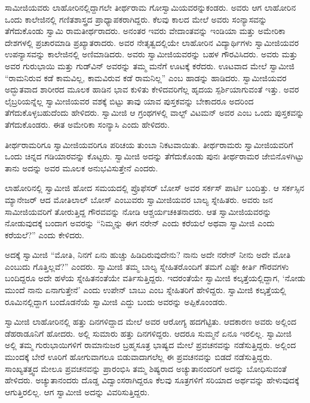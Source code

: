  ಸಾಮೀಜಿಯವರು ಲಾಹೋರಿನಲ್ಲಿದ್ದಾಗಲೇ ತೀರ್ಥರಾಮ ಗೋಸ್ವಾಮಿಯವರನ್ನು\break ಕಂಡರು. ಅವರು ಆಗ ಲಾಹೋರಿನ ಒಂದು ಕಾಲೇಜಿನಲ್ಲಿ ಗಣಿತಶಾಸ್ತ್ರದ ಪ್ರಾಧ್ಯಾಪಕರಾಗಿದ್ದರು. ಕೆಲವು ಕಾಲದ ಮೇಲೆ ಅವರು ಸಂನ್ಯಾಸವನ್ನು ತೆಗೆದುಕೊಂಡು ಸ್ವಾಮಿ ರಾಮತೀರ್ಥರಾದರು. ಅನಂತರ ಇವರು ವೇದಾಂತವನ್ನು ಇಂಡಿಯಾ ಮತ್ತು ಅಮೇರಿಕಾ ದೇಶಗಳಲ್ಲಿ ಪ್ರಚಾರಮಾಡಿ ಪ್ರಖ್ಯಾತರಾದರು. ಅವರ ನೇತೃತ್ವದಲ್ಲಿಯೇ ಲಾಹೋರಿನ ವಿದ್ಯಾರ್ಥಿಗಳು ಸ್ವಾಮೀಜಿಯವರ ಉಪನ್ಯಾಸವನ್ನು ಕಾಲೇಜಿನಲ್ಲಿ ಅಣಿಮಾಡಿದರು. ಅವರು ಸ್ವಾಮೀಜಿಯವರನ್ನು ಬಹಳ ಗೌರವಿಸಿದರು. ಅವರು ಮತ್ತು ಅವರ ಗುರುಭಾಯಿ ಮತ್ತು ಗುಡ್‍ವಿನ್ ಅವರನ್ನು ತಮ್ಮ ಮನೆಗೆ ಊಟಕ್ಕೆ ಕರೆದರು. ಊಟವಾದ ಮೇಲೆ ಸ್ವಾಮೀಜಿ “ರಾಮನಿರುವ ಕಡೆ ಕಾಮವಿಲ್ಲ, ಕಾಮವಿರುವ ಕಡೆ ರಾಮನಿಲ್ಲ” ಎಂಬ ಹಾಡನ್ನು ಹಾಡಿದರು. ಸ್ವಾಮೀಜಿಯವರ ಅದ್ಭುತವಾದ ಶಾರೀರದ ಮೂಲಕ ಹಾಡಿನ ಭಾವ ಕುಳಿತು ಕೇಳಿದವರಿಗೆಲ್ಲ ಹೃದಯ ಸ್ಪರ್ಶಿಯಾಗುವಂತೆ ಇತ್ತು. ಅವರ ಲೈಬ್ರರಿಯನ್ನೆಲ್ಲ ಸ್ವಾಮೀಜಿಯವರ ವಶಕ್ಕೆ ಬಿಟ್ಟು ತಾವು ಯಾವ ಪುಸ್ತಕವನ್ನು ಬೇಕಾದರೂ ಅದರಿಂದ ತೆಗೆದುಕೊಳ್ಳಬಹುದೆಂದು ಹೇಳಿದರು. ಸ್ವಾಮೀಜಿ ಆ ಗ್ರಂಥಗಳಲ್ಲಿ ವಾಲ್ಟ್ ವಿಟಮನ್ ಅವರ  ಎಂಬ ಒಂದು ಪುಸ್ತಕವನ್ನು ತೆಗೆದುಕೊಂಡರು. ಈತ ಅಮೇರಿಕಾ ಸಂನ್ಯಾಸಿ ಎಂದು ಹೇಳಿದರು. 

 ತೀರ್ಥರಾಮರಿಗೂ ಸ್ವಾಮೀಜಿಯವರಿಗೂ ಪರಿಚಯ ತುಂಬಾ ನಿಕಟವಾಯಿತು. ತೀರ್ಥರಾಮರು ಸ್ವಾಮೀಜಿಯವರಿಗೆ ಒಂದು ಚಿನ್ನದ ಗಡಿಯಾರವನ್ನು ಕೊಟ್ಟರು. ಸ್ವಾಮೀಜಿ ಅದನ್ನು ತೆಗೆದುಕೊಂಡು ಪುನಃ ತೀರ್ಥರಾಮರ ಜೇಬಿನೊಳಗಿಟ್ಟು ತಾನು ಅದನ್ನು ಅವರ ಮೂಲಕ ಅನುಭವಿಸುತ್ತೇನೆ ಎಂದರು. 

 ಲಾಹೋರಿನಲ್ಲಿ ಸ್ವಾಮೀಜಿ ಹೋದ ಸಮಯದಲ್ಲಿ ಪ್ರೊಫೆಸರ್ ಬೋಸ್ ಅವರ ಸರ್ಕಸ್ ಪಾರ್ಟಿ ಬಂದಿತ್ತು. ಆ ಸರ್ಕಸ್ಸಿನ ಮ್ಯಾನೇಜರ್ ಆದ ಮೋತಿಲಾಲ್ ಬೋಸ್ ಎಂಬುವರು ಸ್ವಾಮೀಜಿಯವರ ಬಾಲ್ಯ ಸ್ನೇಹಿತರು. ಅವರು ಜನ ಸಾಮೀಜಿಯವರಿಗೆ ತೋರುತ್ತಿದ್ದ ಗೌರವವನ್ನು ನೋಡಿ ಆಶ್ಚರ್ಯಚಕಿತನಾದರು. ಆತ ಸ್ವಾಮೀಜಿಯವರನ್ನು ನೋಡುವುದಕ್ಕೆ ಬಂದಾಗ ಅವರನ್ನು “ನಿಮ್ಮನ್ನು ಈಗ ನರೇನ್ ಎಂದು ಕರೆಯಲೆ ಅಥವಾ ಸ್ವಾಮೀಜಿ ಎಂದು ಕರೆಯಲೆ?” ಎಂದು ಕೇಳಿದರು. 

 ಅದಕ್ಕೆ ಸ್ವಾಮೀಜಿ “ಮೋತಿ, ನಿನಗೆ ಏನು ಹುಚ್ಚು ಹಿಡಿದಿರುವುದೇನು? ನಾನು ಅದೇ ನರೇನ್ ನೀನು ಅದೇ ಮೋತಿ ಎಂಬುದು ಗೊತ್ತಿಲ್ಲವೆ?” ಎಂದರು. ಸ್ವಾಮೀಜಿ ತಮ್ಮ ಬಾಲ್ಯ ಸ್ನೇಹಿತರೊಂದಿಗೆ ತಮಗೆ ಎಷ್ಟೇ ಕೀರ್ತಿ ಗೌರವಗಳು ಬಂದಿದ್ದರೂ ಅದೇ ಹಳೆಯ ಸ್ನೇಹಿತನಂತೆಯೇ ವರ್ತಿಸುತ್ತಿದ್ದರು. ಇದರಂತೆಯೇ ಸ್ವಾಮೀಜಿ ಕಲ್ಕತ್ತೆಯಲ್ಲಿದ್ದಾಗ, ‘ನೋಡು ಮುಂದೆ ನಾನು ಏನಾಗುತ್ತೇನೆ’ ಎಂದು ಉಪೇನ್ ಬಾಬು ಎಂಬ ಸ್ನೇಹಿತರಿಗೆ ಹೇಳಿದ್ದರು. ಸ್ವಾಮೀಜಿ ಕಲ್ಕತ್ತೆಯಲ್ಲಿ ರೂಮಿನಲ್ಲಿದ್ದಾಗ ಬಂದೊಡನೆಯೆ ಸ್ವಾಮೀಜಿ ಎದ್ದು ಬಂದು ಅವರನ್ನು ಅಪ್ಪಿಕೊಂಂಡರು. 

 ಸ್ವಾಮೀಜಿ ಲಾಹೋರಿನಲ್ಲಿ ಹತ್ತು ದಿನಗಳಿದ್ದಾದ ಮೇಲೆ ಅವರ ಆರೋಗ್ಯ ಹದಗೆಟ್ಟಿತು. ಆದಕಾರಣ ಅವರು ಅಲ್ಲಿಂದ ಡೆಹರಾಡೂನಿಗೆ ಹೋದರು. ಅಲ್ಲಿ ಸುಮಾರು ಹತ್ತು ದಿನಗಳಿದ್ದರು. ಆದರೂ ಸುಮ್ಮನೆ ಏನೂ ಇರಲಿಲ್ಲ. ಸ್ವಾಮೀಜಿ ಅಲ್ಲಿ ತಮ್ಮ ಗುರುಭಾಯಿಗಳಿಗೆ ರಾಮಾನುಜರ ಬ್ರಹ್ಮಸೂತ್ರ ಭಾಷ್ಯದ ಮೇಲೆ ಪ್ರವಚನವನ್ನು ನಡೆಸುತ್ತಿದ್ದರು. ಅಲ್ಲಿಂದ ಮುಂದಕ್ಕೆ ಬೇರೆ ಊರಿಗೆ ಹೋಗುವಾಗಲೂ ಬಿಡುವಾದಾಗಲೆಲ್ಲ ಈ ಪ್ರವಚನವನ್ನು ಬಿಡದೆ ನಡೆಸುತ್ತಿದ್ದರು. ಸಾಂಖ್ಯತತ್ತ್ವದ ಮೇಲೂ ಪ್ರವಚನವನ್ನು ಪ್ರಾರಂಭಿಸಿ ತಮ್ಮ ಶಿಷ್ಯರಾದ ಅಚ್ಯುತಾನಂದರಿಗೆ ಅದನ್ನು ಬೋಧಿಸುವಂತೆ ಹೇಳಿದರು. ಅಚ್ಯುತಾನಂದರು ದೊಡ್ಡ ವಿದ್ವಾಂಸರಾಗಿದ್ದರೂ ಕೆಲವು ಸೂತ್ರಗಳಿಗೆ ಸರಿಯಾದ ಅರ್ಥವನ್ನು ಹೇಳುವುದಕ್ಕೆ ಆಗುತ್ತಿರಲಿಲ್ಲ. ಆಗ ಸ್ವಾಮೀಜಿ ಅದನ್ನು ವಿವರಿಸುತ್ತಿದ್ದರು. 


